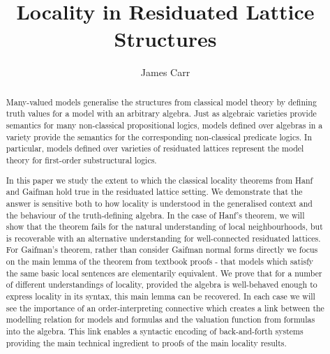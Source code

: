 \documentclass{lmcs} %
\newcommand{\?}{\ensuremath{\mkern0.4\thinmuskip}}
\begin{document}
\title[Residuated Lattice Locality]{Locality in Residuated Lattice Structures}

\author[J.~Carr]{James Carr} %


\address{University of Queensland}


\begin{abstract}
\noindent Many-valued models generalise the structures from classical model theory by defining truth values for a model with an arbitrary algebra. Just as algebraic varieties provide semantics for many non-classical propositional logics, models defined over algebras in a variety provide the semantics for the corresponding non-classical predicate logics. In particular, models defined over varieties of residuated lattices represent the model theory for first-order substructural logics.

In this paper we study the extent to which the classical locality theorems from Hanf and Gaifman hold true in the residuated lattice setting. We demonstrate that the answer is sensitive both to how locality is understood in the generalised context and the behaviour of the truth-defining algebra. In the case of Hanf's theorem, we will show that the theorem fails for the natural understanding of local neighbourhoods, but is recoverable with an alternative understanding  for well-connected residuated lattices. For Gaifman's theorem, rather than consider Gaifman normal forms directly we focus on the main lemma of the theorem from textbook proofs - that models which satisfy the same basic local sentences are elementarily equivalent. We prove that for a number of different understandings of locality, provided the algebra is well-behaved enough to express locality in its syntax, this main lemma can be recovered. In each case we will see the importance of an order-interpreting connective which creates a link between the modelling relation for models and formulas and the valuation function from formulas into the algebra. This link enables a syntactic encoding of back-and-forth systems providing the main technical ingredient to proofs of the main locality results. 
\end{abstract}
\end{document}

